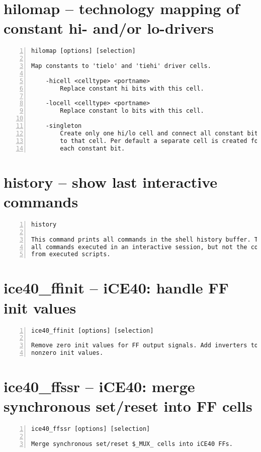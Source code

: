 \section{hilomap -- technology mapping of constant hi- and/or lo-drivers}
\label{cmd:hilomap}
\begin{lstlisting}[numbers=left,frame=single]
    hilomap [options] [selection]

Map constants to 'tielo' and 'tiehi' driver cells.

    -hicell <celltype> <portname>
        Replace constant hi bits with this cell.

    -locell <celltype> <portname>
        Replace constant lo bits with this cell.

    -singleton
        Create only one hi/lo cell and connect all constant bits
        to that cell. Per default a separate cell is created for
        each constant bit.
\end{lstlisting}

\section{history -- show last interactive commands}
\label{cmd:history}
\begin{lstlisting}[numbers=left,frame=single]
    history

This command prints all commands in the shell history buffer. This are
all commands executed in an interactive session, but not the commands
from executed scripts.
\end{lstlisting}

\section{ice40\_ffinit -- iCE40: handle FF init values}
\label{cmd:ice40_ffinit}
\begin{lstlisting}[numbers=left,frame=single]
    ice40_ffinit [options] [selection]

Remove zero init values for FF output signals. Add inverters to implement
nonzero init values.
\end{lstlisting}

\section{ice40\_ffssr -- iCE40: merge synchronous set/reset into FF cells}
\label{cmd:ice40_ffssr}
\begin{lstlisting}[numbers=left,frame=single]
    ice40_ffssr [options] [selection]

Merge synchronous set/reset $_MUX_ cells into iCE40 FFs.
\end{lstlisting}

